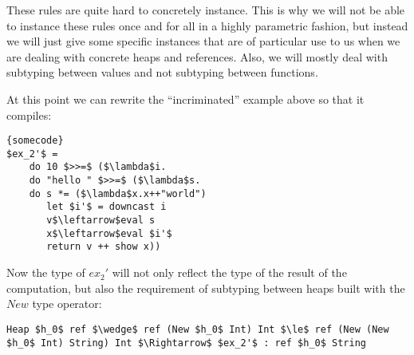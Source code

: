 \documentclass[a4paper]{article}
\begin{document}
These rules are quite hard to concretely instance. This is why we will not be able to instance these rules once and for all in a highly parametric fashion, but instead we will just give some specific instances that are of particular use to us when we are dealing with concrete heaps and references. Also, we will mostly deal with subtyping between values and not subtyping between functions.

At this point we can rewrite the ``incriminated'' example above so that it compiles:

\begin{lstlisting}[frame=tb,mathescape]{somecode}
$ex_2'$ =
	do 10 $>>=$ ($\lambda$i.
	do "hello " $>>=$ ($\lambda$s.
	do s *= ($\lambda$x.x++"world")
	   let $i'$ = downcast i
	   v$\leftarrow$eval s
	   x$\leftarrow$eval $i'$
	   return v ++ show x))
\end{lstlisting}

Now the type of $ex_2'$ will not only reflect the type of the result of the computation, but also the requirement of subtyping between heaps built with the $New$ type operator:

\begin{lstlisting}
Heap $h_0$ ref $\wedge$ ref (New $h_0$ Int) Int $\le$ ref (New (New $h_0$ Int) String) Int $\Rightarrow$ $ex_2'$ : ref $h_0$ String
\end{lstlisting}
\end{document}
